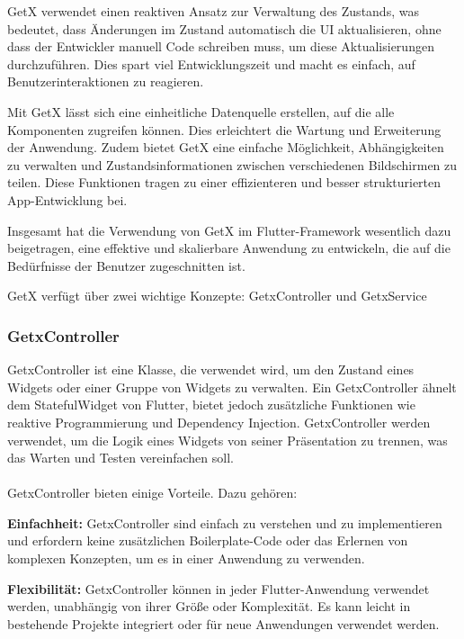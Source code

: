 GetX\cite{package_get} verwendet einen reaktiven Ansatz zur Verwaltung des Zustands, was bedeutet, dass Änderungen im Zustand automatisch die UI aktualisieren, ohne dass der Entwickler manuell Code schreiben muss, um diese Aktualisierungen durchzuführen. Dies spart viel Entwicklungszeit und macht es einfach, auf Benutzerinteraktionen zu reagieren.

Mit GetX lässt sich eine einheitliche Datenquelle erstellen, auf die alle Komponenten zugreifen können. Dies erleichtert die Wartung und Erweiterung der Anwendung. Zudem bietet GetX eine einfache Möglichkeit, Abhängigkeiten zu verwalten und Zustandsinformationen zwischen verschiedenen Bildschirmen zu teilen. Diese Funktionen tragen zu einer effizienteren und besser strukturierten App-Entwicklung bei.

Insgesamt hat die Verwendung von GetX im Flutter-Framework wesentlich dazu beigetragen, eine effektive und skalierbare Anwendung zu entwickeln, die auf die Bedürfnisse der Benutzer zugeschnitten ist.



GetX verfügt über zwei wichtige Konzepte: GetxController und GetxService

\subsubsection{GetxController}
GetxController ist eine Klasse, die verwendet wird, um den Zustand eines Widgets oder einer Gruppe von Widgets zu verwalten. Ein GetxController ähnelt dem StatefulWidget von Flutter, bietet jedoch zusätzliche Funktionen wie reaktive Programmierung und Dependency Injection. GetxController werden verwendet, um die Logik eines Widgets von seiner Präsentation zu trennen, was das Warten und Testen vereinfachen soll.
\\\\
GetxController bieten einige Vorteile. Dazu gehören:

\textbf{Einfachheit:}
GetxController sind einfach zu verstehen und zu implementieren und erfordern keine zusätzlichen Boilerplate-Code oder das Erlernen von komplexen Konzepten, um es in einer Anwendung zu verwenden.

\textbf{Flexibilität:}
GetxController können in jeder Flutter-Anwendung verwendet werden, unabhängig von ihrer Größe oder Komplexität. Es kann leicht in bestehende Projekte integriert oder für neue Anwendungen verwendet werden.

